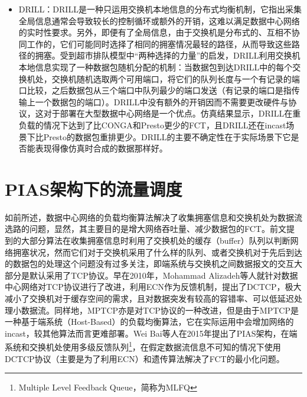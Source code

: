 \begin{itemize}
    \item DRILL\cite{ghorbani2015drill}：DRILL是一种只运用交换机本地信息的分布式均衡机制，它指出采集全局信息通常会导致较长的控制循环或额外的开销，这难以满足数据中心网络的实时性要求。另外，即便有了全局信息，由于交换机是分布式的、互相不协同工作的，它们可能同时选择了相同的拥塞情况最轻的路径，从而导致这些路径的拥塞。受到超市排队模型中“两种选择的力量”的启发\cite{mitzen2001power}，DRILL利用交换机本地信息实现了一种数据包随机分配的机制：当数据包到达DRILL中的每个交换机处，交换机随机选取两个可用端口，将它们的队列长度与一个有记录的端口比较，之后数据包从三个端口中队列最少的端口发送（有记录的端口是指传输上一个数据包的端口）。DRILL中没有额外的开销因而不需要更改硬件与协议，这对于部署在大型数据中心网络是一个优点。仿真结果显示，DRILL在重负载的情况下达到了比CONGA和Presto更少的FCT，且DRILL还在incast场景下比Presto的数据包重排更少。DRILL的主要不确定性在于实际场景下它是否能表现得像仿真时合成的数据那样好。
\end{itemize}


\section{PIAS架构下的流量调度}
如前所述，数据中心网络的负载均衡算法解决了收集拥塞信息和交换机处为数据流选路的问题，显然，其主要目的是增大网络吞吐量、减少数据包的FCT。前文提到的大部分算法在收集拥塞信息时利用了交换机处的缓存（buffer）队列以判断网络拥塞状况，然而它们对于交换机采用了什么样的队列、或者交换机对于先后到达的数据包的处理这个问题没有过多关注，即端系统与交换机之间数据报文的交互大部分是默认采用了TCP协议。早在2010年，Mohammad Alizadeh等人就针对数据中心网络对TCP协议进行了改进，利用ECN作为反馈机制，提出了DCTCP\cite{alizadeh2010dctcp}，极大减小了交换机对于缓存空间的需求，且对数据突发有较高的容错率、可以低延迟处理小数据流。同样地，MPTCP\cite{raiciu2011MPTCP}亦是对TCP协议的一种改进，但是由于MPTCP是一种基于端系统（Host-Based）的负载均衡算法，它在实际运用中会增加网络的incast，较其他算法而言更难部署。Wei Bai等人在2015年提出了PIAS架构\cite{bai2015pias}，在端系统和交换机处使用多级反馈队列\footnote{Multiple Level Feedback Queue，简称为MLFQ}，在假定数据流信息不可知的情况下使用DCTCP协议（主要是为了利用ECN）和遗传算法解决了FCT的最小化问题。

